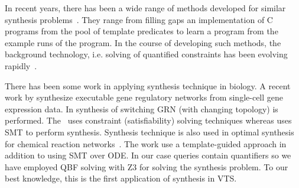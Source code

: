 In recent years, there has been a wide range of methods
developed for similar synthesis problems~\cite{sketch,sygus,exampleSynth}.
%
They range from filling gaps an implementation of C programs from the pool of template predicates to learn a program from the example
runs of the program.
%
In the course of developing such methods,
the background technology, i.e. solving of quantified
constraints has been evolving rapidly~\cite{lonsing2010depqbf,z3Quant}.
%

There has been some work in applying synthesis technique in biology. %
A recent work by \cite{fisher2015synthesising} synthesize executable gene regulatory networks from single-cell gene expression data.
%
In \cite{shavit2016automated} synthesis of switching GRN (with changing topology) is performed.
%
The~\cite{fisher2015synthesising} uses constraint (satisfiability) solving techniques whereas \cite{shavit2016automated} uses SMT to perform synthesis. 
%
Synthesis technique is also used in optimal synthesis for chemical reaction networks~\cite{cardelli2017syntax}.
%
%
The work
use a template-guided approach in addition to using SMT over ODE. In our case queries contain quantifiers so we have employed QBF solving with Z3 for solving the synthesis problem. 
%
To our best knowledge, this is the first application of synthesis in VTS.
